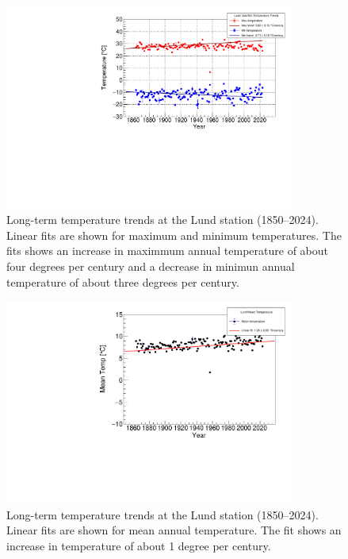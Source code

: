 \begin{figure}[H]
    \centering
        \centering
        \includegraphics[width=0.85\textwidth]{../plots/max_min_temps/Lund_max_min_trends.pdf}
        \caption{Long-term temperature trends at the Lund station (1850--2024). 
    Linear fits are shown for maximum and minimum temperatures. The fits shows an increase in maximmum annual temperature of about four degrees per century and a decrease in minimun annual temperature of about three degrees per century.}
        \label{fig:lund_maxmin}
\end{figure}
\begin{figure}[H]
        \centering
        \includegraphics[width=0.85\textwidth]{../plots/mean_temps/Lund_mean_trend.pdf}
        \caption{Long-term temperature trends at the Lund station (1850--2024). 
    Linear fits are shown for mean annual temperature. The fit shows an increase in temperature of about 1 degree per century.}
        \label{fig:lund_mean}
\end{figure}


